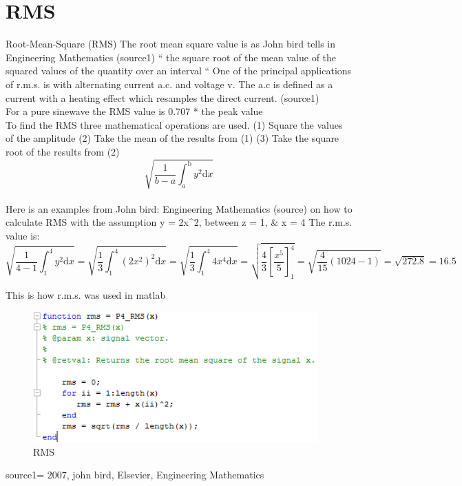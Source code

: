 \section{RMS}

Root-Mean-Square (RMS)
The root mean square value is as John bird tells in Engineering Mathematics (source1) “ the square root of the mean value of the squared values of the quantity over an interval “
One of the principal applications of r.m.s. is with alternating current a.c. and voltage v. The a.c is defined as a current with a heating effect which resamples the direct current. (source1)
\\
For a pure sinewave the RMS value is 0.707 * the peak value
\\
To find the RMS three mathematical operations are used.
(1)	Square the values of the amplitude
(2)	Take the mean of the results from (1)
(3)	Take the square root of the results from (2)
\begin{equation}\label{eq:RMS formular}
\sqrt{\frac{1}{b-a} \int_a^\mathrm{b}y^2\mathrm{d}x}
\end{equation}
\\
Here is an examples from John bird: Engineering Mathematics (source) on how to calculate RMS with the assumption y = 2x^2, between z = 1, & x = 4
The r.m.s. value is:
\\
\begin{equation}\label{eq:RMS formular}
\sqrt{\frac{1}{4-1} \int_1^\mathrm{4}y^2\mathrm{d}x} =
\sqrt{\frac{1}{3} \int_1^\mathrm{4}(2x^2)^2\mathrm{d}x} = 
\sqrt{\frac{1}{3} \int_1^\mathrm{4}4x^4\mathrm{d}x} = 
\sqrt{\frac{4}{3} [\frac{x^5}{5}]_1^4} =
\sqrt{\frac{4}{15} (1024-1)} = 
\sqrt{272.8} = 16.5
\end{equation}

This is how r.m.s. was used in matlab
\begin{figure}
\begin{center}
\includegraphics[height=5cm]{fig/RMS_matlabCode.png}
\caption{RMS}
\end{center}
\end{figure}

source1= 2007, john bird, Elsevier, Engineering Mathematics